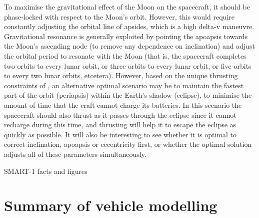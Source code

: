 To maximise the gravitational effect of the Moon on the spacecraft, it should be phase-locked with respect to the Moon's orbit. However, this would require constantly adjusting the orbital line of apsides, which is a high delta-v maneuvre. Gravitational resonance is generally exploited by pointing the apoapsis towards the Moon's ascending node (to remove any dependence on inclination) and adjust the orbital period to resonate with the Moon (that is, the spacecraft completes two orbits to every lunar orbit, or three orbits to every lunar orbit, or five orbits to every two lunar orbits, etcetera). However, based on the unique thrusting constraints of \BW, an alternative optimal scenario may be to maintain the fastest part of the orbit (periapsis) within the Earth's shadow (eclipse), to minimise the amount of time that the craft cannot charge its batteries. In this scenario the spacecraft should also thrust as it passes through the eclipse since it cannot recharge during this time, and thrusting will help it to escape the eclipse as quickly as possible. It will also be interesting to see whether it is optimal to correct inclination, apoapsis or eccentricity first, or whether the optimal solution adjusts all of these parameters simultaneously.
 

 



\cite{Estublier2007} SMART-1 facts and figures


\section{Summary of vehicle modelling} \label{sec:Summary-vehicle}